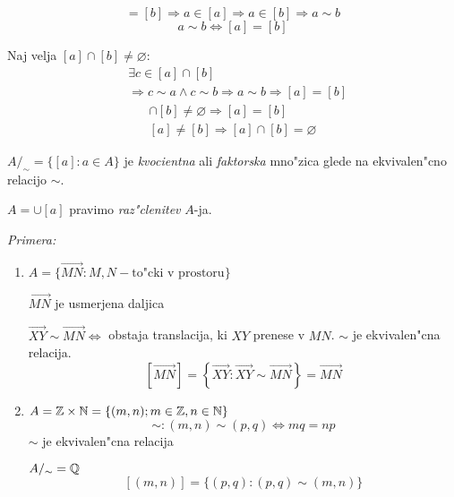 \begin{equation*}
[a] = [b] \Rightarrow a \in [a] \Rightarrow a \in [b] \Rightarrow a \sim b
\end{equation*}
%
\begin{equation*}
a \sim b \iff [a] = [b]
\end{equation*}

Naj velja $[a] \cap [b] \neq \varnothing$:
\begin{align*}
&\exists c \in [a] \cap [b]\\
&\Rightarrow c \sim a \land c \sim b \Rightarrow a \sim b \Rightarrow [a] = [b]
\end{align*}
%
\begin{gather*}
	[a] \cap [b] \neq \varnothing \Rightarrow [a] = [b]\\
	[a] \neq [b] \Rightarrow [a] \cap [b] = \varnothing
\end{gather*}

$A/_\sim = \{[a]: a \in A\}$ je \emph{kvocientna} ali \emph{faktorska} mno"zica glede na ekvivalen"cno relacijo $\sim$.

$A = \cup [a]$ pravimo \emph{raz"clenitev} $A$-ja.

\emph{Primera:}
\begin{enumerate}[(1)]
	\item $A = \{\overrightarrow{MN}: M,N - \text{to"cki v prostoru} \}$
	
	$\overrightarrow{MN}$ je usmerjena daljica
	
	$\overrightarrow{XY} \sim \overrightarrow{MN} \iff$ obstaja translacija, ki $XY$ prenese v $MN$. $\sim$ je ekvivalen"cna relacija.
	\begin{equation*}
	\left[\overrightarrow{MN}\right] = \left\{\overrightarrow{XY}: \overrightarrow{XY} \sim \overrightarrow{MN}\right\} = \vec{MN}
	\end{equation*}
	
	\item $A = \mathbb{Z} \times \mathbb{N} = \{(m,n); m \in \mathbb{Z}, n \in \mathbb{N}\}$
	\begin{equation*}
	\sim: (m,n) \sim (p,q) \iff mq = np
	\end{equation*}
	$\sim$ je ekvivalen"cna relacija
	
	$A/_\sim = \mathbb{Q}$
	\begin{equation*}
	\left[(m,n)\right] = \{(p, q): (p, q) \sim (m, n)\}
	\end{equation*}
\end{enumerate}

